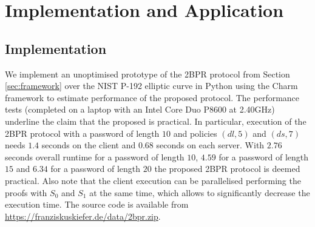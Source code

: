 \section{Implementation and Application}

\subsection{Implementation}
We implement an unoptimised prototype of the 2BPR protocol from Section \ref{sec:framework} over the NIST P-192 elliptic curve \cite{nist} in Python using the Charm framework \cite{charm13} to estimate performance of the proposed protocol.
The performance tests (completed on a laptop with an Intel Core Duo P8600 at 2.40GHz) underline the claim that the proposed is practical.
In particular, execution of the 2BPR protocol with a password of length $10$ and policies $(dl, 5)$ and $(ds, 7)$ needs $1.4$ seconds on the client and $0.68$ seconds on each server.
With $2.76$ seconds overall runtime for a password of length $10$, $4.59$ for a password of length $15$ and $6.34$ for a password of length $20$ the proposed 2BPR protocol is deemed practical.
Also note that the client execution can be parallelised performing the proofs with $S_0$ and $S_1$ at the same time, which allows to significantly decrease the execution time.
The source code is available from \url{https://franziskuskiefer.de/data/2bpr.zip}.

